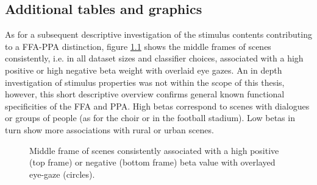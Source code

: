 \documentclass[a4paper, 12pt]{scrreprt}
\begin{document}
\begin{appendices}
	
\chapter{Additional tables and graphics}\label{A:addons}

As for a subsequent descriptive investigation of the stimulus contents contributing to a FFA-PPA distinction, figure \ref{fig:scenes} shows the middle frames of scenes consistently, i.e. in all dataset sizes and classifier choices, associated with a high positive or high negative beta weight with overlaid eye gazes.
An in depth investigation of stimulus properties was not within the scope of this thesis, however, this short descriptive overview confirms general known functional specificities of the FFA and PPA. High betas correspond to scenes with dialogues or groups of people (as for the choir or in the football stadium). Low betas in turn show more associations with rural or urban scenes.

\begin{figure}[H]
	\caption[Descriptive analysis of diagnostic scenes]{\small{Middle frame of scenes consistently associated with a high positive (top frame) or negative (bottom frame) beta value with overlayed eye-gaze (circles).}}
	\label{fig:scenes}
\end{figure}
	


\end{appendices}
\end{document}
